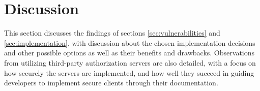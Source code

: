 \clearpage

\section{Discussion}
This section discusses the findings of sections \ref{sec:vulnerabilities} and \ref{sec:implementation}, with discussion about the chosen implementation decisions and
other possible options as well as their benefits and drawbacks.
Observations from utilizing third-party authorization servers are also detailed, with a focus on how securely the servers are implemented, and how well they succeed in guiding developers to implement secure clients through their documentation.




